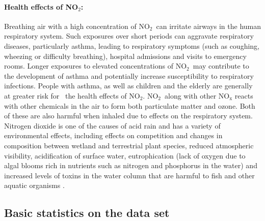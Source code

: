 \documentclass[a4paper,12pt,reqno]{article}
\begin{document}
    \paragraph{Health effects of NO$_2$:}
    Breathing air with a high concentration of NO$_2$ can 
    irritate airways in the human respiratory system. Such 
    exposures over short periods can aggravate respiratory 
    diseases, particularly asthma, leading to respiratory 
    symptoms (such as coughing, wheezing or difficulty 
    breathing), hospital admissions and visits to emergency 
    rooms. Longer exposures to elevated concentrations of 
    NO$_2$ may contribute to the development of asthma and 
    potentially increase susceptibility to respiratory 
    infections. People with asthma, as well as children and 
    the elderly are generally at greater risk for  the 
    health effects of NO$_2$.
    NO$_2$ along with other NO$_{\mathrm{x}}$ reacts with 
    other chemicals in the air to form both particulate 
    matter and ozone. Both of these are also harmful when 
    inhaled due to effects on the respiratory system.\\
    Nitrogen dioxide is one of the causes of acid rain 
    and has a variety of environmental effects, including 
    effects on competition and changes in composition 
    between wetland and terrestrial plant species, 
    reduced atmospheric visibility, acidification of 
    surface water, eutrophication (lack of oxygen due 
    to algal blooms rich in nutrients such as nitrogen 
    and phosphorus in the water) and increased levels 
    of toxins in the water column that are harmful to 
    fish and other aquatic organisms \cite{Baidu_nitrogen}.

\vspace{-0.5cm}
\subsection*{Basic statistics on the data set}
\end{document}
